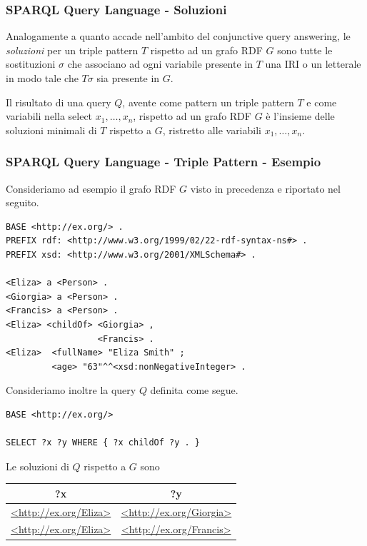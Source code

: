\documentclass[8pt]{beamer}
\begin{document}
\begin{frame}[fragile]
\frametitle{SPARQL Query Language - Soluzioni}
Analogamente a quanto accade nell'ambito del conjunctive query answering,
le \emph{soluzioni} per un triple pattern $T$ rispetto ad un grafo RDF $G$ 
sono tutte le sostituzioni $\sigma$ che associano ad ogni variabile presente 
in $T$ una IRI o un letterale in modo tale che $T\sigma$ sia presente in $G$.
\vspace{\baselineskip}

Il risultato di una query $Q$, avente come pattern un triple pattern $T$
e come variabili nella select $x_1, \ldots, x_n$,
rispetto ad un grafo RDF $G$ \`e l'insieme delle soluzioni minimali di $T$
rispetto a $G$, ristretto alle variabili $x_1, \ldots, x_n$.
\end{frame}

\begin{frame}[fragile]
 \frametitle{SPARQL Query Language - Triple Pattern - Esempio}
 Consideriamo ad esempio il grafo RDF $G$ visto in precedenza e riportato nel 
 seguito.
 \begin{Verbatim}[fontsize=\small]
BASE <http://ex.org/> .
PREFIX rdf: <http://www.w3.org/1999/02/22-rdf-syntax-ns#> .
PREFIX xsd: <http://www.w3.org/2001/XMLSchema#> .

<Eliza> a <Person> .
<Giorgia> a <Person> .
<Francis> a <Person> .
<Eliza> <childOf> <Giorgia> ,
                  <Francis> .
<Eliza>  <fullName> "Eliza Smith" ;
         <age> "63"^^<xsd:nonNegativeInteger> .
\end{Verbatim}

Consideriamo inoltre la query $Q$ definita come segue.

\begin{Verbatim}[fontsize=\small]
BASE <http://ex.org/>

SELECT ?x ?y WHERE { ?x childOf ?y . }
\end{Verbatim}

Le soluzioni di $Q$ rispetto a $G$ sono
\begin{tabular}{|c|c|}
\hline 
?x & ?y \\
\hline
\url{<http://ex.org/Eliza>} & \url{<http://ex.org/Giorgia>} \\
\url{<http://ex.org/Eliza>} & \url{<http://ex.org/Francis>} \\
\hline 
\end{tabular}
\end{frame}
\end{document}
